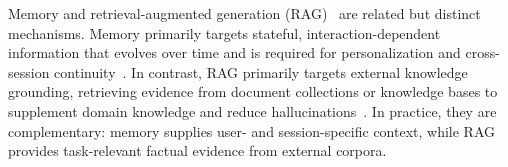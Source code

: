 
Memory and retrieval-augmented generation (RAG)~\cite{lewis2020retrieval, gutierrez2024hipporag, wang2024llmagentsurvey,gao2023retrieval} are related but distinct mechanisms. Memory primarily targets stateful, interaction-dependent information that evolves over time and is required for personalization and cross-session continuity~\cite{zhong2024memorybank, packer2023memgpt}. In contrast, RAG primarily targets external knowledge grounding, retrieving evidence from document collections or knowledge bases to supplement domain knowledge and reduce hallucinations~\cite{lewis2020retrieval, gao2023retrieval}. In practice, they are complementary: memory supplies user- and session-specific context, while RAG provides task-relevant factual evidence from external corpora.



